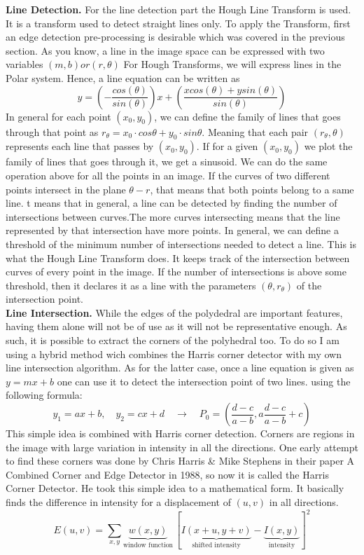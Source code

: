 \documentclass[crop=false]{standalone}
\begin{document}
\noindent \textbf{Line Detection.} For the line detection part the Hough Line Transform is used. It is a transform used to detect straight lines only. To apply the Transform, first an edge detection pre-processing is desirable which was covered in the previous section. As you know, a line in the image space can be expressed with two variables $(m, b) or (r, \theta)$ For Hough Transforms, we will express lines in the Polar system. Hence, a line equation can be written as
$$
y = \left(-\frac{cos(\theta)}{sin(\theta)}\right)x + \left( \frac{x cos(\theta) + y sin(\theta)}{sin(\theta)}\right)
$$
\noindent In general for each point $(x_0,y_0)$, we can define the family of lines that goes through that point as $r_\theta=x_0⋅cos\theta+y_0⋅sin\theta$. Meaning that each pair $(r_\theta,\theta)$ represents each line that passes by $(x_0,y_0)$. If for a given $(x_0,y_0)$ we plot the family of lines that goes through it, we get a sinusoid. We can do the same operation above for all the points in an image. If the curves of two different points intersect in the plane $\theta - r$, that means that both points belong to a same line. t means that in general, a line can be detected by finding the number of intersections between curves.The more curves intersecting means that the line represented by that intersection have more points. In general, we can define a threshold of the minimum number of intersections needed to detect a line. This is what the Hough Line Transform does. It keeps track of the intersection between curves of every point in the image. If the number of intersections is above some threshold, then it declares it as a line with the parameters $(\theta,r_\theta)$ of the intersection point.
\\

\noindent \textbf{Line Intersection.} While the edges of the polydedral are important features, having them alone will not be of use as it will not be representative enough. As such, it is possible to extract the corners of the polyhedral too. To do so I am using a hybrid method wich combines the Harris corner detector with my own line intersection algorithm. As for the latter case, once a line equation is given as $y = mx+b$ one can use it to detect the intersection point of two lines. using the following formula:
$$
y_1 = ax+b,\quad y_2 = cx+d \quad \rightarrow \quad P_0 = \left(\frac{d-c}{a-b}, a\frac{d-c}{a-b}+c\right)
$$
This simple idea is combined with Harris corner detection. Corners are regions in the image with large variation in intensity in all the directions. One early attempt to find these corners was done by Chris Harris & Mike Stephens in their paper A Combined Corner and Edge Detector in 1988, so now it is called the Harris Corner Detector. He took this simple idea to a mathematical form. It basically finds the difference in intensity for a displacement of $(u,v)$ in all directions.
$$
E(u,v) = \sum_{x,y} \underbrace{w(x,y)}_\text{window function} \, [\underbrace{I(x+u,y+v)}_\text{shifted intensity}-\underbrace{I(x,y)}_\text{intensity}]^2
$$
\end{document}
